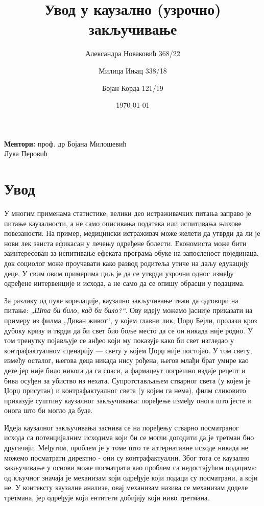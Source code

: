 \documentclass[12pt, a4paper]{article}
\title{Увод у каузално (узрочно) закључивање}
\author{Александра Новаковић 368/22}
\author{Милица Ињац 338/18}
\author{Бојан Корда 121/19}
\affil{Математички факултет, Универзитет у Београду}
\date{\today}
\begin{document}
\maketitle
\vfill
\begin{center}
\textbf{Ментори:} проф. др Бојана Милошевић\\
Лука Перовић
\end{center}
\newpage

\tableofcontents
\newpage

\section{Увод}
У многим применама статистике, велики део истраживачких питања заправо је питање каузалности, а не само описивања података или испитивања њихове повезаности.
На пример, медицински истраживач може желети да утврди да ли је нови лек заиста ефикасан у лечењу одређене болести. Економиста може бити заинтересован за испитивање ефеката програма обуке на запосленост појединаца, док социолог може проучавати како развод родитеља утиче на даљу едукацију деце. 
У свим овим примерима циљ је да се утврди узрочни однос између одређене интервенције и исхода, а не само да се опишу обрасци у подацима.

За разлику од пуке корелације, каузално закључивање тежи да одговори на питање: \textit{„Шта би било, кад би било?“}. Ову идеју можемо јасније приказати на примеру из филма „Диван живот“, у којем главни лик, Џорџ Бејли, пролази кроз дубоку кризу и тврди да би свет био боље место да се он никада није родио. У том тренутку појављује се анђео који му показује како би свет изгледао у контрафактуалном сценарију — свету у којем Џорџ није постојао. У том свету, између осталог, његова деца никада нису рођена, његов млађи брат умире као дете јер није било никога да га спаси, а фармацеут погрешно издаје рецепт и бива осуђен за убиство из нехата. Супротстављањем стварног света (у којем је Џорџ присутан) и контрафактуалног света (у којем га нема), филм сликовито приказује суштину каузалног закључивања: поређење између онога 
што јесте и онога што би могло да буде.

Идеја каузалног закључивања заснива се на поређењу стварно посматраног исхода са потенцијалним исходима који би се могли догодити да је третман био другачији. 
Међутим, проблем је у томе што те алтернативне исходе никада не можемо посматрати директно - они су контрафактуални. Због тога се каузално закључивање у основи може посматрати као проблем са недостајућим подацима: од кључног значаја је механизам који одређује који подаци су посматрани, а који не. У контексту каузалне анализе, овај механизам назива се механизам доделе третмана, јер одређује који ентитети добијају који ниво третмана.
\end{document}
